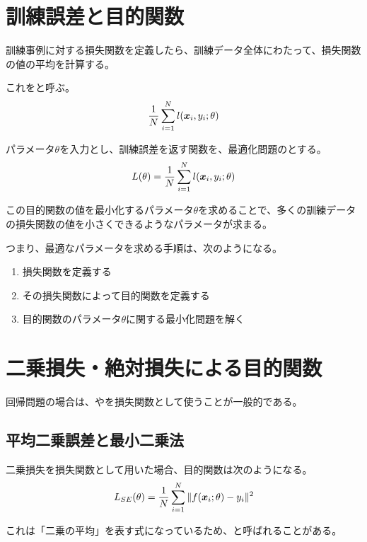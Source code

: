 \documentclass[../../../topic_machine-learning]{subfiles}
\begin{document}
\sectionline
\section{訓練誤差と目的関数}

訓練事例に対する損失関数を定義したら、訓練データ全体にわたって、損失関数の値の平均を計算する。

これをと呼ぶ。
\begin{equation*}
  \frac{1}{N} \sum_{i=1}^{N} l(\vb*{x}_i, y_i; \theta)
\end{equation*}

パラメータ$\theta$を入力とし、訓練誤差を返す関数を、最適化問題のとする。
\begin{equation*}
  L(\theta) = \frac{1}{N} \sum_{i=1}^{N} l(\vb*{x}_i, y_i; \theta)
\end{equation*}

この目的関数の値を最小化するパラメータ$\theta$を求めることで、多くの訓練データの損失関数の値を小さくできるようなパラメータが求まる。

つまり、最適なパラメータを求める手順は、次のようになる。
\begin{enumerate}
  \item 損失関数を定義する
  \item その損失関数によって目的関数を定義する
  \item 目的関数のパラメータ$\theta$に関する最小化問題を解く
\end{enumerate}

\sectionline
\section{二乗損失・絶対損失による目的関数}

回帰問題の場合は、やを損失関数として使うことが一般的である。

\subsection{平均二乗誤差と最小二乗法}

二乗損失を損失関数として用いた場合、目的関数は次のようになる。
\begin{equation*}
  L_{SE}(\theta) = \frac{1}{N} \sum_{i=1}^{N} \|f(\vb*{x}_i; \theta) - y_i\|^2
\end{equation*}

これは「二乗の平均」を表す式になっているため、と呼ばれることがある。
\end{document}
